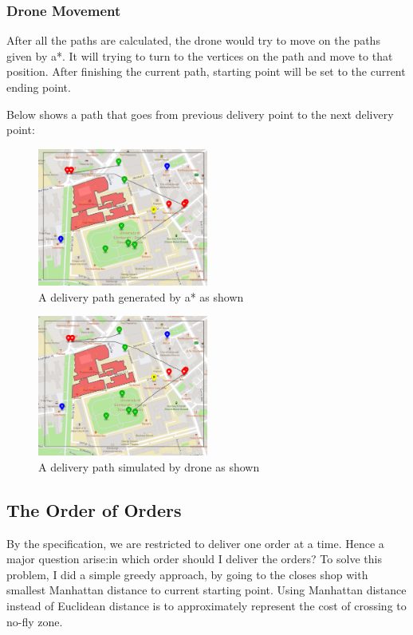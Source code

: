 \documentclass[a4paper,article,fontsize=15pt]{scrartcl}
\numberwithin{equation}{section}		%
\numberwithin{figure}{section}			%
\numberwithin{table}{section}				%
\begin{document}
\newpage

\subsubsection{Drone Movement}
After all the paths are calculated, the drone would try to move on the paths given by a*. It will trying to turn to the vertices on the path  and move to that position. After finishing the current path, starting point will be set to the current ending point.

Below shows a path that goes from previous delivery point to the next delivery point:
    \begin{figure}[H]
        \centering
    	    \includegraphics[width=0.5\textwidth]{astaronepath.png}
    	\caption{A delivery path generated by a* as shown}
        \label{astaronepath}
    \end{figure}

    \begin{figure}[H]
        \centering
    	    \includegraphics[width=0.5\textwidth]{moveonepath.png}
    	\caption{A delivery path simulated by drone as shown}
        \label{moveonepath}
    \end{figure}
\subsection{The Order of Orders}
By the specification, we are restricted to deliver one order at a time. Hence a major question arise:in which order should I deliver the orders?
To solve this problem, I did a simple greedy approach, by going to the closes shop with smallest Manhattan distance to current starting point. Using Manhattan distance instead of Euclidean distance is to approximately represent the cost of crossing to no-fly zone.\hfill\newline
\end{document}
